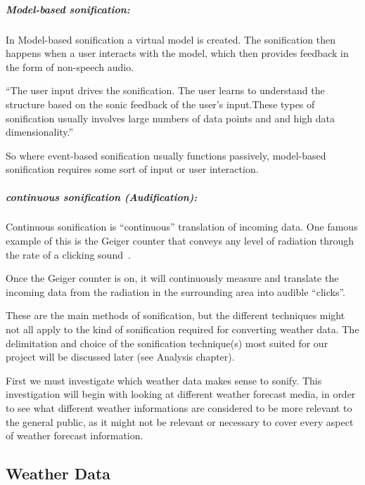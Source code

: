 \subparagraph{Model-based sonification:} %
\label{subp:model_based_sonification_}
In Model-based sonification a virtual model is created. 
The sonification then happens when a user interacts with the model, which then provides feedback in the form of non-speech audio.

\enquote{The user input drives the sonification. The user learns to understand the structure based on the sonic feedback of the user’s input.These types of sonification usually involves large numbers of data points and and high data dimensionality.}~\cite*[pp.17]{Hermann2011}

So where event-based sonification usually functions passively, model-based sonification requires some sort of input or user interaction.

\subparagraph{continuous sonification (Audification):} %
\label{subp:audification_continues_sonification_}
Continuous sonification is “continuous” translation of incoming data. One famous example of this is the Geiger counter that conveys any level of radiation through the rate of a clicking sound~\cite*{Wiki2014-2}.

Once the Geiger counter is on, it will continuously measure and translate the incoming data from the radiation in the surrounding area into audible “clicks”.

These are the main methods of sonification, but the different techniques might not all apply to the kind of sonification required for converting weather data. 
The delimitation and choice of the sonification technique(s) most suited for our project will be discussed later (see Analysis chapter).

First we must investigate which weather data makes sense to sonify. 
This investigation will begin with looking at different weather forecast media, in order to see what different weather informations are considered to be more relevant to the general public, as it might not be relevant or necessary to cover every aspect of weather forecast information.




\subsection{Weather Data} %
\label{sub:weather_data}


